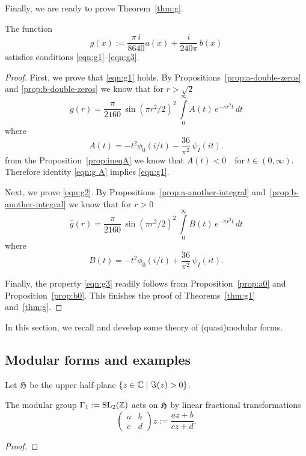 Finally, we are ready to prove Theorem~\ref{thm:g}.
\begin{theorem}\label{thm:g1}
\leanok
The function
$$g(x):=\frac{\pi\,i}{8640}a(x)+\frac{i}{240\pi}\,b(x)$$
satisfies conditions \eqref{eqn:g1}--\eqref{eqn:g3}.
\end{theorem}
\begin{proof}
First, we prove that \eqref{eqn:g1} holds. By Propositions~\ref{prop:a-double-zeros} and \ref{prop:b-double-zeros} we know that for $r>\sqrt{2}$
\begin{equation}\label{eqn:g A} g(r)=\frac{\pi}{2160}\,\sin(\pi r^2/2)^2\,\int\limits_0^\infty A(t)\,e^{-\pi r^2 t}\,dt\end{equation}
where $$A(t)=-t^2\phi_0(i/t)-\frac{36}{\pi^2}\,\psi_I(it).$$
from the Proposition~\ref{prop:ineqA} we know that $A(t)<0\quad\mbox{for}\;t\in(0,\infty).$
Therefore identity \eqref{eqn:g A} implies \eqref{eqn:g1}.

Next, we prove \eqref{eqn:g2}. By Propositions~\ref{prop:a-another-integral} and~\ref{prop:b-another-integral} we know that for $r>0$
\begin{equation}\label{eqn:g B} \widehat{g}(r)=\frac{\pi}{2160}\,\sin(\pi r^2/2)^2\,\int\limits_0^\infty B(t)\,e^{-\pi r^2 t}\,dt\end{equation}
where $$B(t)=-t^2\phi_0(i/t)+\frac{36}{\pi^2}\,\psi_I(it).$$


Finally, the property \eqref{eqn:g3} readily follows from Proposition~\ref{prop:a0} and Proposition~\ref{prop:b0}.
This finishes the proof of Theorems~\ref{thm:g1} and~\ref{thm:g}.
\end{proof}


In this section, we recall and develop some theory of (quasi)modular forms.

\subsection{Modular forms and examples}

Let $\mathfrak{H}$ be the upper half-plane $\{z\in\mathbb{C}\mid\Im(z)>0\}$.
\begin{lemma}\label{def:Gamma-1-Action}\leanok
    The modular group $\Gamma_1:=\mathrm{SL}_2(\mathbb{Z})$ acts on $\mathfrak{H}$ by linear fractional transformations
$$\left(\begin{smallmatrix}a&b\\c&d\end{smallmatrix}\right)z:=\frac{az+b}{cz+d}.$$
\end{lemma}
\begin{proof}
    \leanok
\end{proof}

